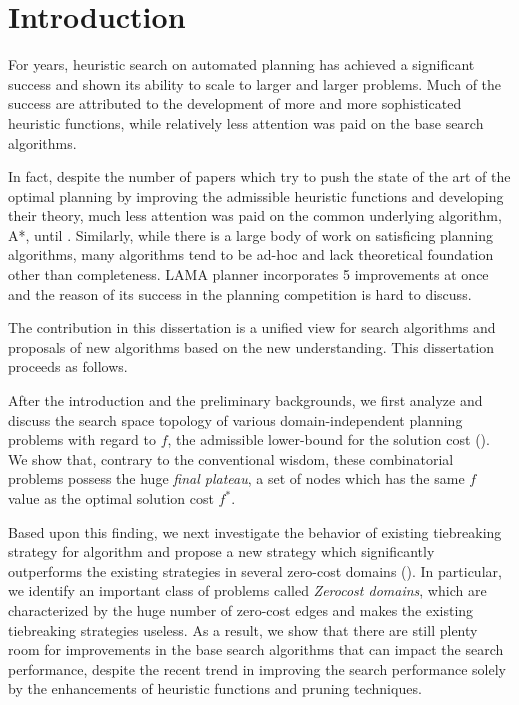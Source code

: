 \chapter{Introduction}

For years, heuristic search on automated planning has achieved a
significant success and shown its ability to scale to larger and larger
problems. Much of the success are attributed to the development of
more and more sophisticated heuristic functions, while relatively less
attention was paid on the base search algorithms.

In fact, despite the number of papers which try to push the state of the art of the
optimal planning by improving the admissible heuristic functions and developing their theory, much
less attention was paid on the common underlying algorithm, A*, until \cite{Asai2016}.  Similarly, while
there is a large body of work on satisficing planning algorithms, many algorithms tend to be ad-hoc
and lack theoretical foundation other than completeness. \sota LAMA planner
\cite{richter2010lama} incorporates 5 improvements at once and the reason of its success in the
planning competition is hard to discuss.

The contribution in this dissertation is a unified view for search
algorithms and proposals of new algorithms based on the new
understanding. This dissertation proceeds as follows.
 
After the introduction and the preliminary backgrounds, we first analyze
and discuss the search space topology of various domain-independent
planning problems with regard to $f$, the admissible lower-bound for the
solution cost ().  We show that, contrary to the
conventional wisdom, these combinatorial problems possess the huge
\emph{final plateau}, a set of nodes which has the same $f$ value as the
optimal solution cost $f^*$.

Based upon this finding, we next investigate the behavior of existing
tiebreaking strategy for \astar algorithm and propose a new strategy
which significantly outperforms the existing strategies in several
zero-cost domains ().  In particular, we identify
an important class of problems called \emph{Zerocost domains}, which are
characterized by the huge number of zero-cost edges and makes the
existing tiebreaking strategies useless.
% 
As a result, we show that there are still plenty room for improvements
in the base search algorithms that can impact the search performance,
despite the recent trend in improving the search performance solely by
the enhancements of heuristic functions and pruning techniques.

